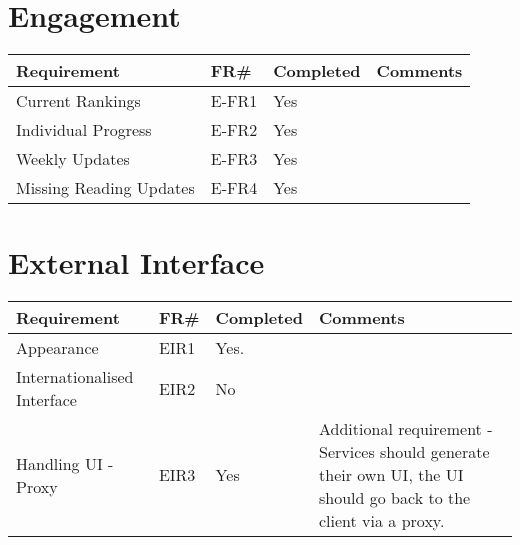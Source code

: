 \section{Engagement}
\begin{tabular}{ |p{5cm}|l|l|p{8cm}|}
\hline
\textbf{Requirement}	&	\textbf{FR\#}	&	\textbf{Completed}	&	\textbf{Comments} \\
\hline
Current Rankings 									& E-FR1		& Yes	&  \\
\hline
Individual Progress									& E-FR2		& Yes	&  \\
\hline
Weekly Updates 										& E-FR3		& Yes	&  \\
\hline
Missing Reading Updates 							& E-FR4		& Yes	&  \\

\hline
\end{tabular}


\section{External Interface}
\begin{tabular}{ |p{5cm}|l|l|p{8cm}|}
\hline
\textbf{Requirement}	&	\textbf{FR\#}	&	\textbf{Completed}	&	\textbf{Comments} \\
\hline
Appearance & EIR1 & Yes. &  \\
\hline
Internationalised Interface & EIR2 & No &  \\
\hline
Handling UI - Proxy & EIR3 & Yes & Additional requirement - Services should generate their own UI, the UI should go back to the client via a proxy. \\
\hline
\end{tabular}

